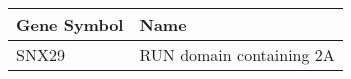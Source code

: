 \begin{tabular}{ll}
\toprule
Gene Symbol &                     Name \\
\midrule
      SNX29 & RUN domain containing 2A \\
\bottomrule
\end{tabular}
